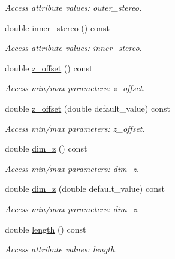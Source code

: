 \begin{DoxyCompactItemize}
\begin{DoxyCompactList}\small\item\em Access attribute values: outer\_\-stereo. \item\end{DoxyCompactList}\item 
double \hyperlink{struct_d_d4hep_1_1_x_m_l_1_1_dimension_af3025ef3808bd4fd9566630901318ba1}{inner\_\-stereo} () const 
\begin{DoxyCompactList}\small\item\em Access attribute values: inner\_\-stereo. \item\end{DoxyCompactList}\item 
double \hyperlink{struct_d_d4hep_1_1_x_m_l_1_1_dimension_aec12547de59daca99bca4ccfeef665c5}{z\_\-offset} () const 
\begin{DoxyCompactList}\small\item\em Access min/max parameters: z\_\-offset. \item\end{DoxyCompactList}\item 
double \hyperlink{struct_d_d4hep_1_1_x_m_l_1_1_dimension_aeec427142a48b401c7a64694093b0b2f}{z\_\-offset} (double default\_\-value) const 
\begin{DoxyCompactList}\small\item\em Access min/max parameters: z\_\-offset. \item\end{DoxyCompactList}\item 
double \hyperlink{struct_d_d4hep_1_1_x_m_l_1_1_dimension_a9d04b0cbb942808effc7245440d3df2f}{dim\_\-z} () const 
\begin{DoxyCompactList}\small\item\em Access min/max parameters: dim\_\-z. \item\end{DoxyCompactList}\item 
double \hyperlink{struct_d_d4hep_1_1_x_m_l_1_1_dimension_af341d18d7b00332ade3d458204054de6}{dim\_\-z} (double default\_\-value) const 
\begin{DoxyCompactList}\small\item\em Access min/max parameters: dim\_\-z. \item\end{DoxyCompactList}\item 
double \hyperlink{struct_d_d4hep_1_1_x_m_l_1_1_dimension_a665ee43ef0013ca8fcf34a1e1bc276ad}{length} () const 
\begin{DoxyCompactList}\small\item\em Access attribute values: length. \item\end{DoxyCompactList}\item 

\end{DoxyCompactItemize}
